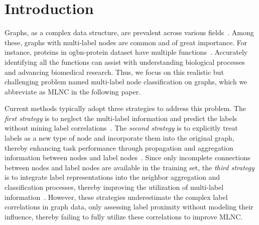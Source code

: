 \section{Introduction} \label{sec:intro}

Graphs, as a complex data structure, are prevalent across various fields~\citep{Jiang2019SemiSupervisedLW,kipf2016variational,ying2018graph,liu2023survey,Fang2024ExploringCO}. Among these, graphs with multi-label nodes are common and of great importance. For instance, proteins in ogbn-protein dataset have multiple functions~\citep{hu2020open}. Accurately identifying all the functions can assist with understanding biological processes and advancing biomedical research. Thus, we focus on this realistic but challenging problem named multi-label node classification on graphs, which we abbreviate as MLNC in the following paper. 


Current methods typically adopt three strategies to address this problem.
The \emph{first strategy} is to neglect the multi-label information and predict the labels without mining label correlations~\citep{shi2020masked,li2023gipa}.
The \emph{second strategy} is to explicitly treat labels as a new type of node and incorporate them into the original graph, thereby enhancing task performance through propagation and aggregation information between nodes and label nodes~\citep{gao2019semisupervised,8894391}. 
Since only incomplete connections between nodes and label nodes are available in the training set, the \emph{third strategy} is to integrate label representations into the neighbor aggregation and classification processes, thereby improving the utilization of multi-label information~\citep{ZHOU2021115063,XIAO2022235}. 
However, these strategies underestimate the complex label correlations in graph data, only assessing label proximity without modeling their influence, thereby failing to fully utilize these correlations to improve MLNC.

